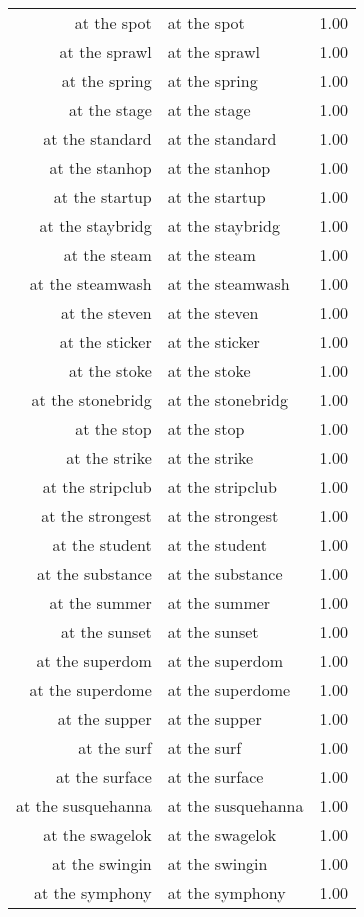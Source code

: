 \begin{table}[ht]
\begin{tabular}{rlr}
  at the spot & at the spot & 1.00 \\ 
  at the sprawl & at the sprawl & 1.00 \\ 
  at the spring & at the spring & 1.00 \\ 
  at the stage & at the stage & 1.00 \\ 
  at the standard & at the standard & 1.00 \\ 
  at the stanhop & at the stanhop & 1.00 \\ 
  at the startup & at the startup & 1.00 \\ 
  at the staybridg & at the staybridg & 1.00 \\ 
  at the steam & at the steam & 1.00 \\ 
  at the steamwash & at the steamwash & 1.00 \\ 
  at the steven & at the steven & 1.00 \\ 
  at the sticker & at the sticker & 1.00 \\ 
  at the stoke & at the stoke & 1.00 \\ 
  at the stonebridg & at the stonebridg & 1.00 \\ 
  at the stop & at the stop & 1.00 \\ 
  at the strike & at the strike & 1.00 \\ 
  at the stripclub & at the stripclub & 1.00 \\ 
  at the strongest & at the strongest & 1.00 \\ 
  at the student & at the student & 1.00 \\ 
  at the substance & at the substance & 1.00 \\ 
  at the summer & at the summer & 1.00 \\ 
  at the sunset & at the sunset & 1.00 \\ 
  at the superdom & at the superdom & 1.00 \\ 
  at the superdome & at the superdome & 1.00 \\ 
  at the supper & at the supper & 1.00 \\ 
  at the surf & at the surf & 1.00 \\ 
  at the surface & at the surface & 1.00 \\ 
  at the susquehanna & at the susquehanna & 1.00 \\ 
  at the swagelok & at the swagelok & 1.00 \\ 
  at the swingin & at the swingin & 1.00 \\ 
  at the symphony & at the symphony & 1.00 \\ 

\end{tabular}
\end{table}
